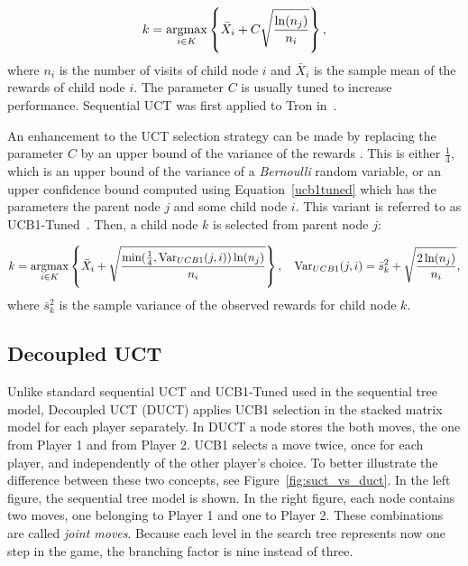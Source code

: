 \documentclass{article}
\newcommand{\argmax}{\operatornamewithlimits{argmax}}
\begin{document}
\begin{equation}\label{uct}
  k = \argmax_{i \in K} \left\{ \bar{X}_{i} + C \sqrt{\frac{\ln (n_{j})}{n_{i}}} \right\},
\end{equation}
where $n_{i}$ is the number of visits of child node $i$ and $\bar{X}_{i}$ is the sample mean of the rewards of child node $i$. 
The parameter $C$ is usually tuned to increase performance. Sequential UCT was first applied to Tron in~\cite{tron_cig}.


An enhancement to the UCT selection strategy can be made by replacing the parameter $C$ by an upper bound of the variance of the rewards \cite{cig_paper}. This is either $\frac{1}{4}$, which is an upper bound of the variance of a \emph{Bernoulli} random variable, or an upper confidence bound computed using Equation~\ref{ucb1tuned} which has the parameters the parent node $j$ and some child node $i$.
This variant is referred to as UCB1-Tuned~\cite{auer_et_al}.
Then, a child node $k$ is selected from parent node $j$:

\begin{equation}\label{ucb1tuned}
k = \argmax_{i \in K} \left\{ \bar{X}_{i} + \sqrt{\frac{\min(\frac{1}{4},\mbox{Var}_{UCB1}(j,i)) \ln (n_{j})}{n_{i}}} \right\}, 
\mbox{ \hspace{0.1cm} } 
\mbox{Var}_{UCB1}(j,i)=\bar{s} ^2_{k}+\sqrt{\frac{2 \ln (n_{j})}{n_{i}}},
\end{equation}
where $\bar{s} ^2_{k}$ is the sample variance of the observed rewards for child node $k$. 


\subsection{Decoupled UCT}
\label{subsec:duct}

Unlike standard sequential UCT and UCB1-Tuned used in the sequential tree model, Decoupled UCT (DUCT) applies UCB1 selection in the stacked matrix model for each player separately.
In DUCT a node stores the both moves, the one from Player 1 and from Player 2. 
UCB1 selects a move twice, once for each player, and independently of the other player's choice.  
To better illustrate the difference between these two concepts, see Figure~\ref{fig:suct_vs_duct}. In the left figure, the sequential tree model is shown. In the right figure, each node contains two moves, one belonging to Player 1 and one to Player 2. These combinations are called {\it joint moves}. Because each level in the search tree represents now one step in the game, the branching factor is nine instead of three.
\end{document}
